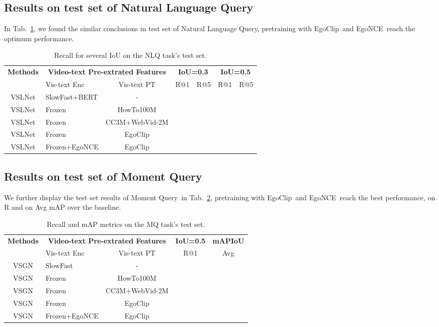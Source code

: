 \documentclass{article}
\newcommand{\dataset}{EgoClip}
\newcommand{\model}{EgoNCE\xspace}
\newcommand{\nlq}{Natural Language Query}
\newcommand{\mq}{Moment Query}
\newcommand{\ccweb}{CC3M+WebVid-2M}
\newcommand{\howto}{HowTo100M}
\begin{document}
\subsection{Results on test set of \nlq}\label{d_nlq}
In Tab.~\ref{nlq_test}, we found the similar conclusions in test set of \nlq, pretraining with \dataset~and \model~reach the optimum performance.
\begin{table}[htb]
\centering
\begin{tabular}{clc|cccc}
	\toprule
	\textbf{Methods} & \multicolumn{2}{c|}{\textbf{Video-text Pre-extrated Features}} & \multicolumn{2}{c}{\textbf{IoU=0.3}} & \multicolumn{2}{c}{\textbf{IoU=0.5}} \\
	& Vis-text Enc & Vis-text PT & R@1 & R@5 & R@1 & R@5 \\  \midrule[1pt] 
	VSLNet  &  SlowFast+BERT   & - &  &  &  &   \\  
	 \midrule
 	VSLNet  &  Frozen       & \howto        &  &   &  &  \\	
	VSLNet  &  Frozen       & \ccweb &  &  &  &  \\		
	VSLNet  &  Frozen       & \dataset      & \underline{} & \underline{} & \underline{} & \underline{}\\
	VSLNet  &  Frozen+\model& \dataset      &  &  &  &  \\	
	\bottomrule
\end{tabular}
\centering
\vspace{0.4em}
\caption{Recall for several IoU on the NLQ task's test set.}
\label{nlq_test}
\vspace{-0.5cm}
\end{table} \subsection{Results on test set of \mq}\label{d_mq}
We further display the test set results of \mq~in Tab.~\ref{mq_test}, pretraining with \dataset~and \model~reach the best performance,  on R and  on Avg mAP over the baseline.
\begin{table}[htb]
\centering
{
\begin{tabular}{clc|cc}
	\toprule
	\textbf{Methods} & \multicolumn{2}{c|}{\textbf{Video-text Pre-extrated Features}} & \multicolumn{1}{c}{\textbf{IoU=0.5}} & \multicolumn{1}{c}{\textbf{mAPIoU}} \\
	& Vis-text Enc & Vis-text PT & R@1  & Avg \\  \midrule[1pt] 
	VSGN &  SlowFast & - &   &    \\ \midrule
	VSGN & Frozen & \howto&    &    \\
	VSGN & Frozen & \ccweb  &   &    \\
	VSGN & Frozen & \dataset  & \underline{}  & \underline{}   \\
	VSGN & Frozen+\model & \dataset &   &    \\
	\bottomrule
\end{tabular}
}
\vspace{0.4em}
\centering
\caption{Recall and mAP metrics on the MQ task's test set.}
\label{mq_test}
\vspace{-0.5cm}
\end{table} 
\end{document}
